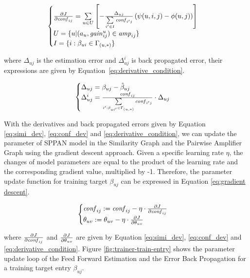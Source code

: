 \begin{equation}
  \label{eq:conf_dev}
  \begin{cases}
    \pa{J}{\confi{ij}}=\sum\limits_{u\in U} \left[ -\frac{\Delta_{uj}}{\sum\limits_{i'\in I} \confi{{i'}{j}}} \left(\psi(u,i,j) - \phi(u,j)\right) \right] \\
    U=\{u|(a_u,\gain{u}{ij})\in\amp{ij}\} \\
    I=\{i:\beta_{{u}{i}}\in\Gamma_{({u},*)}\}
  \end{cases}
\end{equation}

where $\Delta_{uj}$ is the estimation error and $\Delta_{uj}^{i}$ is
back propagated error, their expressions are given by
Equation~\ref{eq:derivative_condition}.

\begin{equation}
  \label{eq:derivative_condition}
  \begin{cases}
    \Delta_{uj}=\beta_{uj}-\hat{\beta}_{uj}\\
    \Delta_{uj}^{i}=\frac{\confi{ij}}{\sconf{u}{i'}{j}}\cdot \Delta_{uj}
  \end{cases}
\end{equation}

With the derivatives and back propagated errors given by Equation
\ref{eq:simi_dev}, \ref{eq:conf_dev} and
\ref{eq:derivative_condition}, we can update the parameter of SPPAN
model in the Similarity Graph and the Pairwise Amplifier Graph using
the gradient descent approach. Given a specific learning rate $\eta$,
the changes of model parameters are equal to the product of the
learning rate and the corresponding gradient value, multiplied by
-1. Therefore, the parameter update function for training target
$\beta_{uj}$ can be expressed in Equation \ref{eq:gradient descent}.

\begin{equation}
  \label{eq:gradient descent}
  \begin{cases}
    \confi{ij} := \confi{ij}-\eta \cdot \pa{J}{\confi{ij}}\\
    \theta_{uv} := \theta_{uv} -\eta \cdot \pa{J}{\theta_{uv}}
  \end{cases}
\end{equation}

\noindent where $\frac{\partial {J}}{\partial {\mathit{conf}_{ij}}}$ and $\frac{\partial {J}}{\partial {\theta_{uv}}}$ are
given by Equation \ref{eq:simi_dev}, \ref{eq:conf_dev} and
\ref{eq:derivative_condition}. Figure \ref{fig:trainer-train-entry}
shows the parameter update loop of the Feed Forward Estimation and the
Error Back Propagation for a training target entry $\beta_{uj}$.

